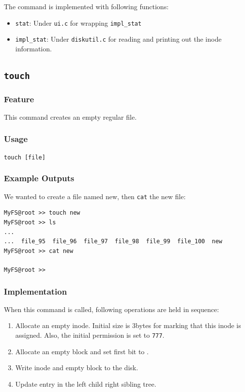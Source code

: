 \documentclass{homework}
\begin{document}
The command is implemented with following functions:
\begin{itemize}
    \item \texttt{stat}: Under \texttt{ui.c} for wrapping \texttt{impl_stat}
    \item \texttt{impl_stat}: Under \texttt{diskutil.c} for reading and printing out the inode information.
\end{itemize}
\pagebreak

\subsection{\texttt{touch}}
\subsubsection{Feature}
This command creates an empty regular file.
\subsubsection{Usage}
\begin{center}
\texttt{touch [file]}
\end{center}

\subsubsection{Example Outputs}
We wanted to create a file named new, then \texttt{cat} the new file:
\\
\begin{center}
\begin{code}
\begin{verbatim}
MyFS@root >> touch new
MyFS@root >> ls
...
...  file_95  file_96  file_97  file_98  file_99  file_100  new
MyFS@root >> cat new

MyFS@root >>
\end{verbatim}
\end{code}
\end{center}

\subsubsection{Implementation}
When this command is called, following operations are held in sequence:
\begin{enumerate}
    \item Allocate an empty inode. Initial size is 3bytes for marking that this inode is assigned. Also, the initial permission is set to \texttt{777}.
    \item Allocate an empty block and set first bit to \texttt{\n}.
    \item Write inode and empty block to the disk.
    \item Update entry in the left child right sibling tree.
\end{enumerate}
\end{document}
